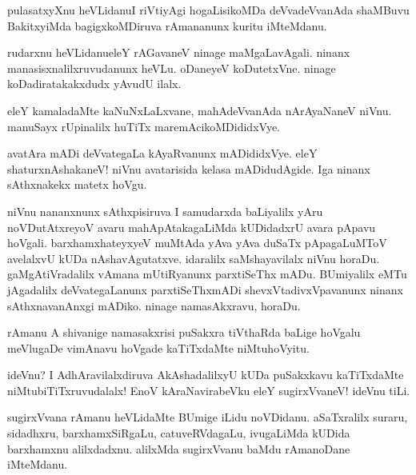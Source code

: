\begin{mng}
pulasatxyXnu heVLidanu\mdash I riVtiyAgi hogaLisikoMDa deVvadeVvanAda shaMBuvu BakitxyiMda bagigxkoMDiruva rAmananunx kuritu iMteMdanu.
\end{mng}

\begin{mng}
rudarxnu heVLidanu\mdash eleY rAGavaneV ninage maMgaLavAgali. ninanx manasisxnalilxruvudanunx heVLu. oDaneyeV koDutetxVne. ninage koDadiratakakxdudx yAvudU ilalx.
\end{mng}

\begin{mng}
eleY kamaladaMte kaNuNxLaLxvane, mahAdeVvanAda nArAyaNaneV niVnu. manuSayx rUpinalilx huTiTx maremAcikoMDididxVye.
\end{mng}

\begin{mng}
avatAra mADi deVvategaLa kAyaRvanunx mADididxVye. eleY shaturxnAshakaneV! niVnu avatarisida kelasa mADidudAgide. Iga ninanx sAthxnakekx matetx hoVgu.
\end{mng}

\begin{mng}
niVnu nananxnunx sAthxpisiruva I samudarxda baLiyalilx yAru noVDutAtxreyoV avaru mahApAtakagaLiMda kUDidadxrU avara pApavu hoVgali. barxhamxhateyxyeV muMtAda yAva yAva duSaTx pApagaLuMToV avelalxvU kUDa nAshavAgutatxve. idaralilx saMshayavilalx niVnu horaDu. gaMgAtiVradalilx vAmana mUtiRyanunx parxtiSeThx mADu. BUmiyalilx eMTu jAgadalilx deVvategaLanunx parxtiSeThxmADi shevxVtadivxVpavanunx ninanx sAthxnavanAnxgi mADiko. ninage namasAkxravu, horaDu.
\end{mng}

\begin{mng}
rAmanu A shivanige namasakxrisi puSakxra tiVthaRda baLige hoVgalu meVlugaDe vimAnavu hoVgade kaTiTxdaMte niMtuhoVyitu.
\end{mng}

\begin{mng}
ideVnu? I AdhAravilalxdiruva AkAshadalilxyU kUDa puSakxkavu kaTiTxdaMte niMtubiTiTxruvudalalx! EnoV kAraNavirabeVku eleY sugirxVvaneV! ideVnu tiLi.
\end{mng}

\begin{mng}
sugirxVvana rAmanu heVLidaMte BUmige iLidu noVDidanu. aSaTxralilx suraru, sidadhxru, barxhamxSiRgaLu, catuveRVdagaLu, ivugaLiMda kUDida barxhamxnu alilxdadxnu. alilxMda sugirxVvanu baMdu rAmanoDane iMteMdanu.
\end{mng}

